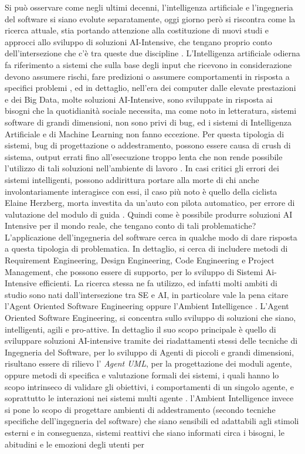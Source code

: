 Si può osservare come negli ultimi decenni, l'intelligenza artificiale e l'ingegneria del software si siano evolute separatamente, oggi giorno però si riscontra come la ricerca attuale, stia portando attenzione alla costituzione di nuovi studi e approcci allo sviluppo di soluzioni AI-Intensive, che tengano proprio conto dell'intersezione che c'è tra queste due discipline \cite{rech2004artificial}. L'Intelligenza artificiale odierna fa riferimento a sistemi che sulla base degli input che ricevono in considerazione devono assumere rischi, fare predizioni o assumere comportamenti in risposta a specifici problemi \cite{shaw2019artificial}, ed in dettaglio, nell'era dei computer dalle elevate prestazioni e dei Big Data, molte soluzioni AI-Intensive, sono sviluppate in risposta ai bisogni che la quotidianità sociale necessita, ma come noto in letteratura, sistemi software di grandi dimensioni, non sono privi di bug, ed i sistemi di Intelligenza Artificiale e di Machine Learning non fanno eccezione. Per questa tipologia di sistemi, bug di progettazione o addestramento, possono essere causa di crush di sistema, output errati fino all'esecuzione troppo lenta che non rende possibile l'utilizzo di tali soluzioni nell'ambiente di lavoro \cite{ML&Bugs}. In casi critici gli errori dei sistemi intelligenti, possono addirittura portare alla morte di chi anche involontariamente interagisce con essi, il caso più noto è quello della ciclista Elaine Herzberg, morta investita da un'auto con pilota automatico, per errore di valutazione del modulo di guida \cite{shaw2019artificial}. Quindi come è possibile produrre soluzioni AI Intensive per il mondo reale, che tengano conto di tali problematiche? L'applicazione dell'ingegneria del software cerca in qualche modo di dare risposta a questa tipologia di problematica. In dettaglio, si cerca di includere metodi di Requirement Engineering, Design Engineering, Code Engineering e Project Management, che possono essere di supporto, per lo sviluppo di Sistemi Ai-Intensive efficienti. La ricerca stessa ne fa utilizzo, ed infatti molti ambiti di studio sono nati dall'intersezione tra SE e AI, in particolare vale la pena citare l'Agent Oriented Software Engineering oppure l'Ambient Intelligence \cite{jain2011interaction}. L'Agent Oriented Software Engineering, si concentra sullo sviluppo di soluzioni che siano, intelligenti, agili e pro-attive. In dettaglio il suo scopo principale è quello di sviluppare soluzioni AI-intensive tramite dei riadattamenti stessi delle tecniche di Ingegneria del Software, per lo sviluppo di Agenti di piccoli e grandi dimensioni, risultano essere di rilievo l' \textit{Agent UML}, per la progettazione dei moduli agente, oppure metodi di specifica e valutazione formali dei sistemi, i quali hanno lo scopo intrinseco di validare gli obiettivi, i comportamenti di un singolo agente, e soprattutto le interazioni nei sistemi multi agente \cite{rech2004artificial}. l'Ambient Intelligence invece si pone lo scopo di progettare ambienti di addestramento (secondo tecniche specifiche dell'ingegneria del software) che siano sensibili ed adattabili agli stimoli esterni e in conseguenza, sistemi reattivi che siano informati circa i bisogni, le abitudini e le emozioni degli utenti per 